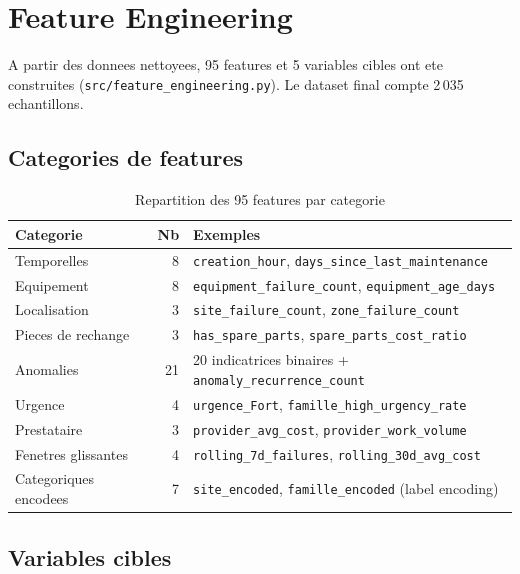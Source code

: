 \documentclass[12pt,a4paper]{article}
\begin{document}
\section{Feature Engineering}

A partir des donnees nettoyees, 95 features et 5 variables cibles ont ete construites (\texttt{src/feature\_engineering.py}). Le dataset final compte 2\,035 echantillons.

\subsection{Categories de features}

\begin{table}[H]
\centering
\begin{tabular}{lrl}
\toprule
\textbf{Categorie} & \textbf{Nb} & \textbf{Exemples} \\
\midrule
Temporelles & 8 & \texttt{creation\_hour}, \texttt{days\_since\_last\_maintenance} \\
Equipement & 8 & \texttt{equipment\_failure\_count}, \texttt{equipment\_age\_days} \\
Localisation & 3 & \texttt{site\_failure\_count}, \texttt{zone\_failure\_count} \\
Pieces de rechange & 3 & \texttt{has\_spare\_parts}, \texttt{spare\_parts\_cost\_ratio} \\
Anomalies & 21 & 20 indicatrices binaires + \texttt{anomaly\_recurrence\_count} \\
Urgence & 4 & \texttt{urgence\_Fort}, \texttt{famille\_high\_urgency\_rate} \\
Prestataire & 3 & \texttt{provider\_avg\_cost}, \texttt{provider\_work\_volume} \\
Fenetres glissantes & 4 & \texttt{rolling\_7d\_failures}, \texttt{rolling\_30d\_avg\_cost} \\
Categoriques encodees & 7 & \texttt{site\_encoded}, \texttt{famille\_encoded} (label encoding) \\
\bottomrule
\end{tabular}
\caption{Repartition des 95 features par categorie}
\end{table}

\subsection{Variables cibles}
\end{document}
